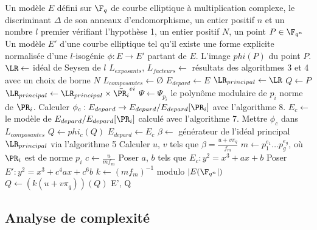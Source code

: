 \begin{algorithm}[h]
	\caption{Algorithme de Borker Charle Lauter}
	\begin{algorithmic}[1]
		\Require Un modèle $E$ défini sur $\F_{q}$ de courbe elliptique à multiplication complexe, le discriminant $\Delta$ de son anneaux d'endomorphisme, un entier positif $n$ et un nombre $l$ premier vérifiant l'hypothèse 1, un entier positif $N$, un point $P\in\F_{q^{n}}$
		\Ensure Un modèle $E'$ d'une courbe elliptique tel qu'il existe une forme explicite normalisée d'une $l$-isogénie $\phi : E \rightarrow E'$ partant de $E$. L'image $phi(P)$ du point $P$.
		\State $\LR\gets$ idéal de Seysen de $l$
		\State $L_{exposants}$, $L_{facteurs}\gets$ résultats des algorithmes 3 et 4 avec un choix de borne $N$
		\State $L_{composantes}\gets$\O
		\State $E_{depard}\gets E$
		\State $\LR_{principal}\gets\LR$
		\State $Q\gets P$
		\State$\LR_{principal}\gets\LR_{principal}\times\bar{\PR_{i}}^{ei}$
		\State$\Psi\gets \Psi_{p_{i}}$ le polynôme modulaire de $p_{i}$ norme de $\PR_{i}$. 
		\State Calculer $\phi_c : E_{depard} \rightarrow E_{depard}/ E_{depard}[\PR_{i}]$ avec l'algorithme 8.
		\State $E_c\gets$ le modèle de $E_{depard}/ E_{depard}[\PR_{i}]$ calculé avec l'algorithme 7.
		\State Mettre $\phi_c$ dans $L_{composantes}$
		\State $Q\gets phi_c(Q)$
		\State $E_{depard}\gets E_c$
		\EndFor
		\EndFor
		\State $\beta\gets$ générateur de l'idéal principal $\LR_{principal}$ via l'algorithme 5
		\State Calculer $u$, $v$ tels que $\beta = \frac{u + v\pi_{q}}{f_{m}}$
		\State $m\gets p_{1}^{e_{1}}\ldots p_{g}^{e_{g}}$, où $\PR_{i}$ est de norme $p_{i}$ 
		\State $c\gets\frac{u}{mf_{m}}$ 
		\State Poser $a$, $b$ tels que $E_c : y^2 = x^3 + ax + b$
		\State Poser $E' : y^2 = x^3 + c^4ax + c^6b$
		\State $k\gets (mf_m)^{-1}$ modulo $|E(\F_{q^{n}}|)$
		\State $Q\gets (k(u + v\pi_{q}))(Q)$
		\State \Return E', Q
		
	\end{algorithmic}
\end{algorithm}

\newpage







\subsection{Analyse de complexité}



